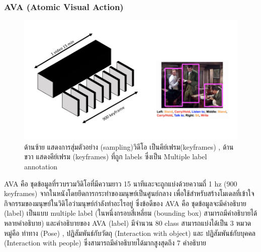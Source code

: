 \clearpage
\subsubsection*{AVA (Atomic Visual Action)}
\begin{figure}[!ht]
	\centering
	\includegraphics[width=1\textwidth]{chapter2/images/AVA.png}
		\caption{ด้านซ้าย แสดงการสุ่มตัวอย่าง (sampling)วิดีโอ เป็นคีย์เฟรม(keyframes) , ด้านขวา แสดงคีย์เฟรม (keyframes) ที่ถูก labels ซึ่งเป็น Multiple label annotation}
    	\label{fig:AVA}
\end{figure}
AVA คือ ชุดข้อมูลที่รวบรวมวิดิโอที่มีความยาว 15 นาทีและจะถูกแบ่งด้วยความถี่ 1 hz (900 keyframes) จากในหนังโดยยึดการกระทำของมนุษย์เป็นศูนย์กลาง เพื่อใช้สำหรับสร้างโมเดลที่เข้าใจกิจกรรมของมนุษย์ในวิดิโอว่ามนุษย์กำลังทำอะไรอยู่ ซึ่งข้อดีของ AVA คือ ชุดข้อมูลจะมีคำอธิบาย (label) เป็นแบบ multiple label (ในหนึ่งกรอบสี่เหลี่ยม (bounding box) สามารถมีคำอธิบายได้หลายคำอธิบาย) และคำอธิบายของ AVA (label) มีจำนวน 80 class สามารถแบ่งได้เป็น 3 หมวดหมู่คือ ท่าทาง (Pose) , ปฏิสัมพันธ์กับวัตถุ (Interaction with object) และ ปฏิสัมพันธ์กับบุคคล (Interaction with people) ซึ่งสามารถมีคำอธิบายได้มากสูงสุดถึง 7 คำอธิบาย

